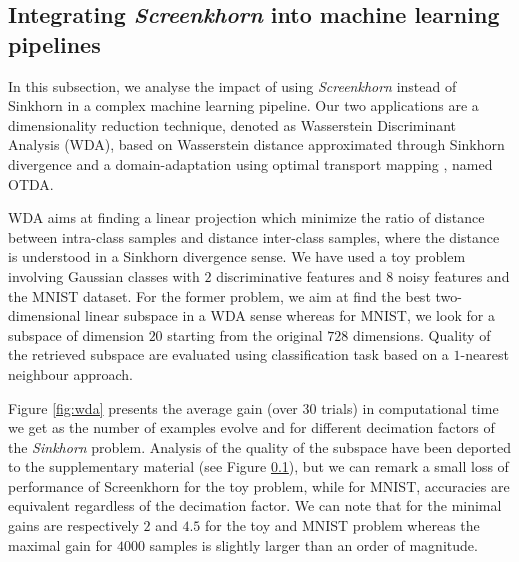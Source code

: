 \subsection{Integrating \emph{Screenkhorn} into machine learning pipelines}

In this subsection, we analyse the impact of using \emph{Screenkhorn}
instead of Sinkhorn in a complex machine learning pipeline. Our two applications
are a dimensionality reduction technique, denoted as Wasserstein Discriminant Analysis (WDA), based on Wasserstein distance approximated
through Sinkhorn divergence \cite{flamary2018WDA} and a domain-adaptation using optimal transport mapping \cite{courty2017optimal}, named OTDA. 


WDA aims at finding a linear projection which minimize the ratio of distance between intra-class samples and distance inter-class samples, where the distance is understood
in a Sinkhorn divergence sense. We have used a toy problem involving Gaussian classes with $2$ discriminative features and $8$ noisy features and the MNIST dataset. For the
former problem, we aim at find the best two-dimensional linear subspace in a WDA sense whereas for MNIST, we look for a subspace of dimension $20$ starting from the original
$728$ dimensions.  Quality of the retrieved subspace are evaluated using classification task based on a $1$-nearest neighbour approach.

Figure \ref{fig:wda} presents the average gain (over $30$ trials) in computational time we get as the number of examples evolve and for different decimation factors of the \emph{Sinkhorn} problem.
Analysis of the quality of the subspace have been deported to the supplementary material (see Figure \ref{}), but we can remark a small loss of performance of Screenkhorn for the toy problem, while
for MNIST, accuracies are equivalent regardless of the decimation factor.  We can note
that for the minimal gains are respectively $2$ and $4.5$ for the toy and MNIST problem
whereas the maximal gain for $4000$ samples is slightly larger than an order of magnitude. 

